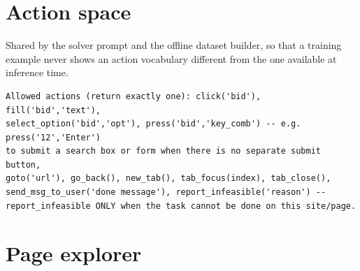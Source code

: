 \section{Action space}
\label{app:prompt-actions}

Shared by the solver prompt and the offline dataset builder, so that a training
example never shows an action vocabulary different from the one available at
inference time.

\begin{lstlisting}[style=mystyle,numbers=none,basicstyle=\scriptsize\ttfamily]
Allowed actions (return exactly one): click('bid'), fill('bid','text'),
select_option('bid','opt'), press('bid','key_comb') -- e.g. press('12','Enter')
to submit a search box or form when there is no separate submit button,
goto('url'), go_back(), new_tab(), tab_focus(index), tab_close(),
send_msg_to_user('done message'), report_infeasible('reason') --
report_infeasible ONLY when the task cannot be done on this site/page.
\end{lstlisting}

\section{Page explorer}
\label{app:prompt-explorer}


